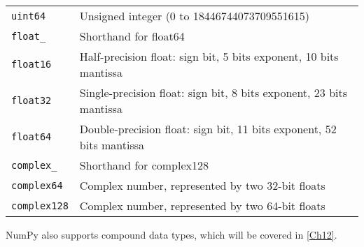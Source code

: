 \begin{table}
\begin{tabular}{ll}
        \verb|uint64|     & Unsigned integer (0 to 18446744073709551615)                                         \\
        \verb|float_|     & Shorthand for float64                                                                \\
        \verb|float16|    & Half-precision float: sign bit, 5 bits exponent, 10 bits mantissa                    \\
        \verb|float32|    & Single-precision float: sign bit, 8 bits exponent, 23 bits mantissa                  \\
        \verb|float64|    & Double-precision float: sign bit, 11 bits exponent, 52 bits mantissa                 \\
        \verb|complex_|   & Shorthand for complex128                                                             \\
        \verb|complex64|  & Complex number, represented by two 32-bit floats                                     \\
        \verb|complex128| & Complex number, represented by two 64-bit floats                                     \\
        \hline
    \end{tabular}
\end{table}
NumPy also supports compound data types, which will be covered in \autoref{Ch12}.